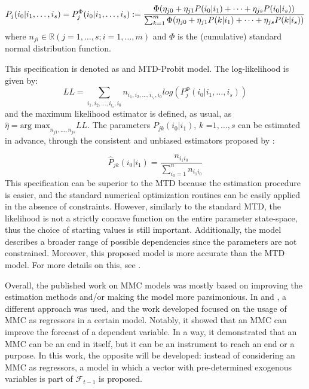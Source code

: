 \begin{equation}
P_j(i_0 | i_1, \dots, i_s) = P_j^{\Phi}(i_0 | i_1, \dots, i_s) :=
\\
 \frac{\Phi(\eta_{j0} + \eta_{j1}P(i_0|i_1) + \dots + \eta_{js}P(i_0|i_s))}{\sum_{k=1}^m \Phi(\eta_{j0} + \eta_{j1}P(k|i_1) + \dots + \eta_{js}P(k|i_s))}
 \label{eq:eq4}
\end{equation} where \(n_{ji} \in \mathbb{R}(j = 1, \dots, s; i = 1, \dots, m)\) and \(\Phi\) is the (cumulative) standard normal distribution function.

This specification is denoted as and MTD-Probit model. The log-likelihood is given by: \begin{equation}
LL = \sum_{i_1, i_2, \dots, i_{i_s}, i_0} n_{i_1, i_2, \dots, i_{i_s}, i_0} log(P_j^{\Phi}(i_0 | i_1, \dots, i_s) ) \label{eq:eq5}
\end{equation} and the maximum likelihood estimator is defined, as usual, as \(\widehat{\eta} = \text{arg max}_{n_{j1}, \dots, n_{js}} LL\). The parameters \(P_{jk}(i_0|i_1)\), \(k\) =\(1, \dots, s\) can be estimated in advance, through the consistent and unbiased estimators proposed by \citet{Ching2002}:

\begin{equation}
\widehat{P}_{jk}(i_0|i_1) = \frac{n_{i_1i_0}}{\sum_{i_0=1}^n n_{i_1 i_0}} \label{eq:eq6}
\end{equation} This specification can be superior to the MTD because the estimation procedure is easier, and the standard numerical optimization routines can be easily applied in the absence of constraints. However, similarly to the standard MTD, the likelihood is not a strictly concave function on the entire parameter state-space, thus the choice of starting values is still important. Additionally, the model describes a broader range of possible dependencies since the parameters are not constrained. Moreover, this proposed model is more accurate than the MTD model. For more details on this, see \citet{Nicolau2014}.

Overall, the published work on MMC models was mostly based on improving the estimation methods and/or making the model more parsimonious. In \citet{Damasio2013} and \citet{DAMASIO2014}, a different approach was used, and the work developed focused on the usage of MMC as regressors in a certain model. Notably, it showed that an MMC can improve the forecast of a dependent variable. In a way, it demonstrated that an MMC can be an end in itself, but it can be an instrument to reach an end or a purpose. In this work, the opposite will be developed: instead of considering an MMC as regressors, a model in which a vector with pre-determined exogenous variables is part of \(\mathcal{F}_{t-1}\) is proposed.

